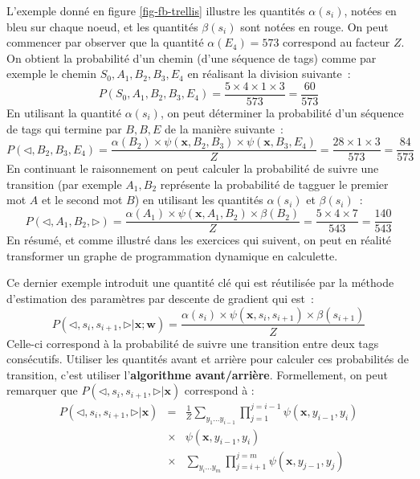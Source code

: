 \documentclass[11pt,openany]{book}
\newcommand{\kw}[1]{{\bf #1}} %
\begin{document}
L'exemple donné en figure \ref{fig-fb-trellis} illustre les quantités $\alpha(s_i)$, notées en bleu sur chaque noeud, et les quantités $\beta(s_i)$ sont notées en rouge.
On peut commencer par observer que la  quantité $\alpha(E_4) = 573$ correspond au facteur $Z$. 
On obtient la probabilité d'un chemin (d'une séquence de tags) comme par exemple le chemin $S_0,A_1,B_2,B_3,E_4$ en réalisant la division suivante~:
\begin{displaymath}
P(S_0,A_1,B_2,B_3,E_4) = \frac{5\times 4\times 1\times 3}{573} = \frac{60}{573}
\end{displaymath}
En utilisant la quantité $\alpha(s_i)$, on peut déterminer la probabilité d'un séquence de tags qui termine par $B,B,E$ de la manière suivante~:
\begin{displaymath}
P(\lhd,B_2,B_3,E_4) = \frac{\alpha(B_2)\times \psi(\mathbf{x},B_2,B_3)\times\psi(\mathbf{x},B_3,E_4)}{Z} = \frac{28\times 1\times 3}{573} = \frac{84}{573} 
\end{displaymath}
En continuant le raisonnement on peut calculer la probabilité de suivre une transition (par exemple $A_1,B_2$ représente la probabilité de tagguer le premier mot $A$ et le second mot $B$) en utilisant les quantités $\alpha(s_i)$ et $\beta(s_i)$~:
\begin{displaymath}
P(\lhd,A_1,B_2,\rhd) = \frac{\alpha(A_1)\times \psi(\mathbf{x},A_1,B_2)\times \beta(B_2)}{Z} = \frac{5\times 4 \times 7}{543}=\frac{140}{543}
\end{displaymath}
En résumé, et comme illustré dans les exercices qui suivent, on peut en réalité transformer un graphe de programmation dynamique en calculette.

Ce dernier exemple introduit une quantité clé qui est réutilisée par la méthode d'estimation des paramètres par descente de gradient qui est~:
\begin{equation}
P(\lhd,s_i,s_{i+1},\rhd | \mathbf{x};\mathbf{w}) = 
\frac{\alpha(s_i)\times \psi(\mathbf{x},s_i,s_{i+1}) \times \beta(s_{i+1})}
{Z}
\end{equation}
Celle-ci correspond à la probabilité de suivre une transition entre deux tags consécutifs. Utiliser les quantités avant et arrière pour calculer ces probabilités de transition, c'est utiliser l'\kw{algorithme avant/arrière}. Formellement, on peut remarquer que $P(\lhd,s_i,s_{i+1},\rhd | \mathbf{x})$ correspond à :
\begin{eqnarray}
P(\lhd,s_i,s_{i+1},\rhd | \mathbf{x})&=& \frac{1}{Z} \sum_{y_1\ldots y_{i-1}}\prod_{j=1}^{j={i-1}} \psi(\mathbf{x},y_{i-1},y_{i})\\
&\times &\psi(\mathbf{x},y_{i-1},y_i)\\
&\times &\sum_{y_i\ldots y_m}\prod_{j={i+1}}^{j=m} \psi(\mathbf{x},y_{j-1},y_{j})
\end{eqnarray}
\end{document}
